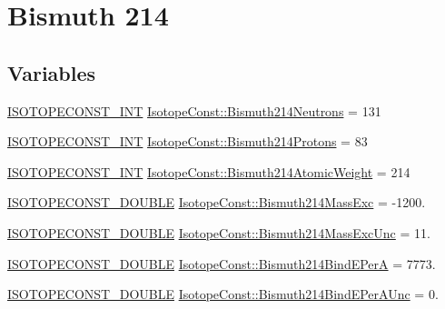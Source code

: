 \hypertarget{group___isotope_const-_bismuth-_bi214}{}\section{Bismuth 214}
\label{group___isotope_const-_bismuth-_bi214}
\subsection*{Variables}
\begin{DoxyCompactItemize}
\item 
\mbox{\hyperlink{group___isotope_const-_macros_ga5f18360b3e99483a35c32d789e62621c}{I\+S\+O\+T\+O\+P\+E\+C\+O\+N\+S\+T\+\_\+\+I\+NT}} \mbox{\hyperlink{group___isotope_const-_bismuth-_bi214_ga56a4f6ee4e8c03d3e53b5687f98eb56c}{Isotope\+Const\+::\+Bismuth214\+Neutrons}} = 131
\item 
\mbox{\hyperlink{group___isotope_const-_macros_ga5f18360b3e99483a35c32d789e62621c}{I\+S\+O\+T\+O\+P\+E\+C\+O\+N\+S\+T\+\_\+\+I\+NT}} \mbox{\hyperlink{group___isotope_const-_bismuth-_bi214_gac3795d371c4dcaa27bda6da5009f3c44}{Isotope\+Const\+::\+Bismuth214\+Protons}} = 83
\item 
\mbox{\hyperlink{group___isotope_const-_macros_ga5f18360b3e99483a35c32d789e62621c}{I\+S\+O\+T\+O\+P\+E\+C\+O\+N\+S\+T\+\_\+\+I\+NT}} \mbox{\hyperlink{group___isotope_const-_bismuth-_bi214_ga7ef621aac91a0b515719cd56abc05d4c}{Isotope\+Const\+::\+Bismuth214\+Atomic\+Weight}} = 214
\item 
\mbox{\hyperlink{group___isotope_const-_macros_ga8f45a7272ce02c0b4c65c44636ed719a}{I\+S\+O\+T\+O\+P\+E\+C\+O\+N\+S\+T\+\_\+\+D\+O\+U\+B\+LE}} \mbox{\hyperlink{group___isotope_const-_bismuth-_bi214_ga9af84f24643ef365029d0fbb5612f285}{Isotope\+Const\+::\+Bismuth214\+Mass\+Exc}} = -\/1200.
\item 
\mbox{\hyperlink{group___isotope_const-_macros_ga8f45a7272ce02c0b4c65c44636ed719a}{I\+S\+O\+T\+O\+P\+E\+C\+O\+N\+S\+T\+\_\+\+D\+O\+U\+B\+LE}} \mbox{\hyperlink{group___isotope_const-_bismuth-_bi214_ga68ab9bef13144eb2f032e49246421e38}{Isotope\+Const\+::\+Bismuth214\+Mass\+Exc\+Unc}} = 11.
\item 
\mbox{\hyperlink{group___isotope_const-_macros_ga8f45a7272ce02c0b4c65c44636ed719a}{I\+S\+O\+T\+O\+P\+E\+C\+O\+N\+S\+T\+\_\+\+D\+O\+U\+B\+LE}} \mbox{\hyperlink{group___isotope_const-_bismuth-_bi214_gad626134e70fb2b3baa975453ce3198fa}{Isotope\+Const\+::\+Bismuth214\+Bind\+E\+PerA}} = 7773.
\item 
\mbox{\hyperlink{group___isotope_const-_macros_ga8f45a7272ce02c0b4c65c44636ed719a}{I\+S\+O\+T\+O\+P\+E\+C\+O\+N\+S\+T\+\_\+\+D\+O\+U\+B\+LE}} \mbox{\hyperlink{group___isotope_const-_bismuth-_bi214_gac2b0c40d4308e8c1857da4e3bd296151}{Isotope\+Const\+::\+Bismuth214\+Bind\+E\+Per\+A\+Unc}} = 0.

\end{DoxyCompactItemize}
